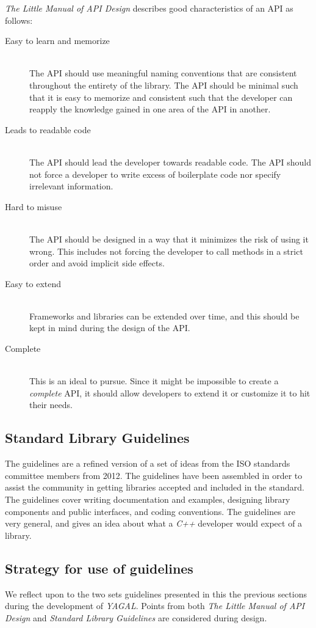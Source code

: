 \textit{The Little Manual of API Design} describes good characteristics of an API as follows:
\begin{description}
\item[Easy to learn and memorize] \hfill \\
The API should use meaningful naming conventions that are consistent throughout the entirety of the library. The API should be minimal such that it is easy to memorize and consistent such that the developer can reapply the knowledge gained in one area of the API in another.
\item[Leads to readable code] \hfill \\
The API should lead the developer towards readable code. The API should not force a developer to write excess of boilerplate code nor specify irrelevant information.
\item[Hard to misuse] \hfill \\
The API should be designed in a way that it minimizes the risk of using it wrong. This includes not forcing the developer to call methods in a strict order and avoid implicit side effects.
\item[Easy to extend]\hfill \\
Frameworks and libraries can be extended over time, and this should be kept in mind during the design of the API.
\item[Complete] \hfill \\
This is an ideal to pursue. Since it might be impossible to create a \textit{complete} API, it should allow developers to extend it or customize it to hit their needs.
\end{description}

\subsection{Standard Library Guidelines}
The guidelines are a refined version of a set of ideas from the ISO standards committee members from 2012. The guidelines have been assembled in order to assist the community in getting libraries accepted and included in the standard. The guidelines cover writing documentation and examples, designing library components and public interfaces, and coding conventions. The guidelines are very general, and gives an idea about what a \textit{C++} developer would expect of a library.

\subsection{Strategy for use of guidelines}
We reflect upon to the two sets guidelines presented in this the previous sections during the development of \textit{YAGAL}. Points from both \textit{The Little Manual of API Design} and \textit{Standard Library Guidelines} are considered during design.%


